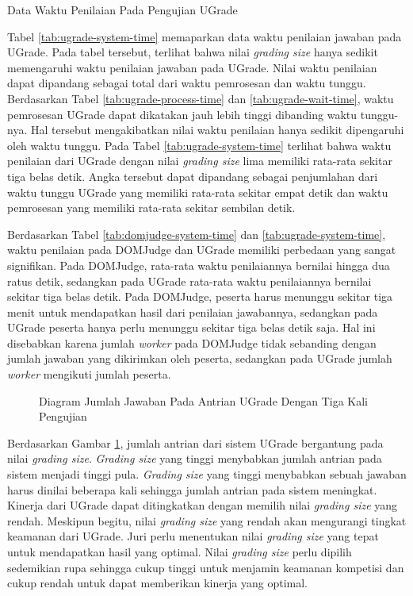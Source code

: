 \begin{table}[ht!]
    \centering
    
    \caption{Data Waktu Penilaian Pada Pengujian UGrade}
    \label{tab:ugrade-system-time}
\end{table}

\par Tabel \ref{tab:ugrade-system-time} memaparkan data waktu penilaian jawaban pada UGrade. Pada tabel tersebut, terlihat bahwa nilai \textit{grading size} hanya sedikit memengaruhi waktu penilaian jawaban pada UGrade. Nilai waktu penilaian dapat dipandang sebagai total dari waktu pemrosesan dan waktu tunggu. Berdasarkan Tabel \ref{tab:ugrade-process-time} dan \ref{tab:ugrade-wait-time}, waktu pemrosesan UGrade dapat dikatakan jauh lebih tinggi dibanding waktu tunggu-nya. Hal tersebut mengakibatkan nilai waktu penilaian hanya sedikit dipengaruhi oleh waktu tunggu. Pada Tabel \ref{tab:ugrade-system-time} terlihat bahwa waktu penilaian dari UGrade dengan nilai \textit{grading size} lima memiliki rata-rata sekitar tiga belas detik. Angka tersebut dapat dipandang sebagai penjumlahan dari waktu tunggu UGrade yang memiliki rata-rata sekitar empat detik dan waktu pemrosesan yang memiliki rata-rata sekitar sembilan detik.

\par Berdasarkan Tabel \ref{tab:domjudge-system-time} dan \ref{tab:ugrade-system-time}, waktu penilaian pada DOMJudge dan UGrade memiliki perbedaan yang sangat signifikan. Pada DOMJudge, rata-rata waktu penilaiannya bernilai hingga dua ratus detik, sedangkan pada UGrade rata-rata waktu penilaiannya bernilai sekitar tiga belas detik. Pada DOMJudge, peserta harus menunggu sekitar tiga menit untuk mendapatkan hasil dari penilaian jawabannya, sedangkan pada UGrade peserta hanya perlu menunggu sekitar tiga belas detik saja. Hal ini disebabkan karena jumlah \textit{worker} pada DOMJudge tidak sebanding dengan jumlah jawaban yang dikirimkan oleh peserta, sedangkan pada UGrade jumlah \textit{worker} mengikuti jumlah peserta.

\begin{figure}[ht!]
    \centering
    
    \caption{Diagram Jumlah Jawaban Pada Antrian UGrade Dengan Tiga Kali Pengujian}
    \label{fig:ugrade-queue}
\end{figure}

\par Berdasarkan Gambar \ref{fig:ugrade-queue}, jumlah antrian dari sistem UGrade bergantung pada nilai \textit{grading size}. \textit{Grading size} yang tinggi menybabkan jumlah antrian pada sistem menjadi tinggi pula. \textit{Grading size} yang tinggi menybabkan sebuah jawaban harus dinilai beberapa kali sehingga jumlah antrian pada sistem meningkat. Kinerja dari UGrade dapat ditingkatkan dengan memilih nilai \textit{grading size} yang rendah. Meskipun begitu, nilai \textit{grading size} yang rendah akan mengurangi tingkat keamanan dari UGrade. Juri perlu menentukan nilai \textit{grading size} yang tepat untuk mendapatkan hasil yang optimal. Nilai \textit{grading size} perlu dipilih sedemikian rupa sehingga cukup tinggi untuk menjamin keamanan kompetisi dan cukup rendah untuk dapat memberikan kinerja yang optimal.

